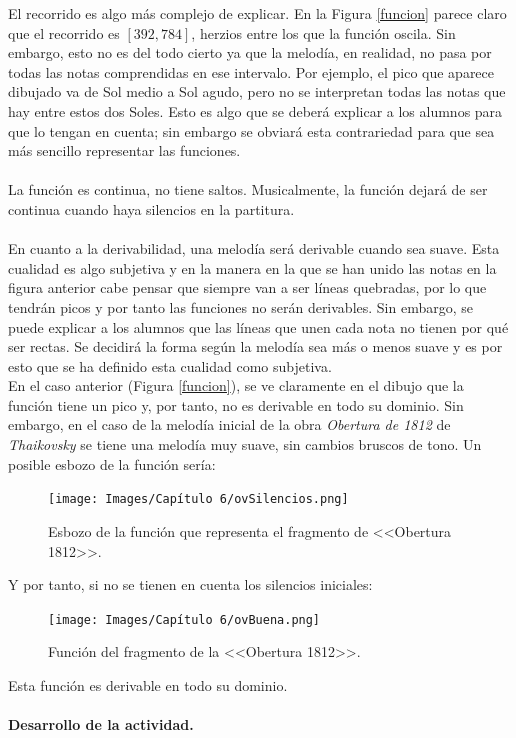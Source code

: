 \documentclass[a4paper, openright, 11pt, titlepage]{report}
\theoremstyle{definition}\newtheorem{defin}[propo]{Definition}
\theoremstyle{definition}\newtheorem{obser}[propo]{Remark}
\theoremstyle{definition}\newtheorem{ejem}[propo]{Ejemplo}
\theoremstyle{definition}\newtheorem{algoritmo}[propo]{Algoritmo}
\begin{document}
El recorrido es algo más complejo de explicar. En la Figura \ref{funcion} parece claro que el recorrido es $[392, 784]$, herzios entre los que la función oscila. Sin embargo, esto no es del todo cierto ya que la melodía, en realidad, no pasa por todas las notas comprendidas en ese intervalo. Por ejemplo, el pico que aparece dibujado va de Sol medio a Sol agudo, pero no se interpretan todas las notas que hay entre estos dos Soles. Esto es algo que se deberá explicar a los alumnos para que lo tengan en cuenta; sin embargo se obviará esta contrariedad para que sea más sencillo representar las funciones.\\\\
La función es continua, no tiene saltos. Musicalmente, la función dejará de ser continua cuando haya silencios en la partitura.\\\\
En cuanto a la derivabilidad, una melodía será derivable cuando sea suave. Esta cualidad es algo subjetiva y en la manera en la que se han unido las notas en la figura anterior cabe pensar que siempre van a ser líneas quebradas, por lo que tendrán picos y por tanto las funciones no serán derivables. Sin embargo, se puede explicar a los alumnos que las líneas que unen cada nota no tienen por qué ser rectas. Se decidirá la forma según la melodía sea más o menos suave y es por esto que se ha definido esta cualidad como subjetiva.\\
En el caso anterior (Figura \ref{funcion}), se ve claramente en el dibujo que la función tiene un pico y, por tanto, no es derivable en todo su dominio. Sin embargo, en el caso de la melodía inicial de la obra \textit{Obertura de 1812} de \textit{Thaikovsky} se tiene una melodía muy suave, sin cambios bruscos de tono. Un posible esbozo de la función sería:
\begin{figure}[H]
    \centering
    \texttt{[image: Images/Capítulo 6/ovSilencios.png]}
    \caption{Esbozo de la función que representa el fragmento de <<Obertura 1812>>.}
\end{figure}
Y por tanto, si no se tienen en cuenta los silencios iniciales:
\begin{figure}[H]
    \centering
    \texttt{[image: Images/Capítulo 6/ovBuena.png]}
    \caption{Función del fragmento de la <<Obertura 1812>>.}
\end{figure}
Esta función es derivable en todo su dominio. \\\\
\textbf{Desarrollo de la actividad.}\\\\
\end{document}
